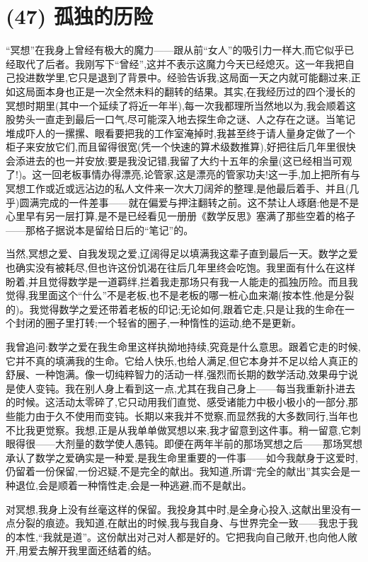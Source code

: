 \section{(47) 孤独的历险}

“冥想”在我身上曾经有极大的魔力——跟从前“女人”的吸引力一样大,而它似乎已经取代了后者。我刚写下“曾经”,这并不表示这魔力今天已经熄灭。这一年我把自己投进数学里,它只是退到了背景中。经验告诉我,这局面一天之内就可能翻过来,正如这局面本身也正是一次全然未料的翻转的结果。其实,在我经历过的四个漫长的冥想时期里(其中一个延续了将近一年半),每一次我都理所当然地以为,我会顺着这股势头一直走到最后一口气,尽可能深入地去探生命之谜、人之存在之谜。当笔记堆成吓人的一摞摞、眼看要把我的工作室淹掉时,我甚至终于请人量身定做了一个柜子来安放它们,而且留得很宽(凭一个快速的算术级数推算),好把往后几年里很快会添进去的也一并安放;要是我没记错,我留了大约十五年的余量(这已经相当可观了!)。这一回老板事情办得漂亮,论管家,这是漂亮的管家功夫!这一手,加上把所有与冥想工作或近或远沾边的私人文件来一次大刀阔斧的整理,是他最后着手、并且(几乎)圆满完成的一件差事——就在偏爱与押注翻转之前。这不禁让人琢磨:他是不是心里早有另一层打算,是不是已经看见一册册《数学反思》塞满了那些空着的格子——那格子据说本是留给日后的“笔记”的。

当然,冥想之爱、自我发现之爱,辽阔得足以填满我这辈子直到最后一天。数学之爱也确实没有被耗尽,但也许这份饥渴在往后几年里终会吃饱。我里面有什么在这样盼着,并且觉得数学是一道羁绊,拦着我走那场只有我一人能走的孤独历险。而且我觉得,我里面这个“什么”不是老板,也不是老板的哪一桩心血来潮(按本性,他是分裂的)。我觉得数学之爱还带着老板的印记;无论如何,跟着它走,只是让我的生命在一个封闭的圈子里打转;一个轻省的圈子,一种惰性的运动,绝不是更新。

 我曾追问:数学之爱在我生命里这样执拗地持续,究竟是什么意思。跟着它走的时候,它并不真的填满我的生命。它给人快乐,也给人满足,但它本身并不足以给人真正的舒展、一种饱满。像一切纯粹智力的活动一样,强烈而长期的数学活动,效果毋宁说是使人变钝。我在别人身上看到这一点,尤其在我自己身上——每当我重新扑进去的时候。这活动太零碎了,它只动用我们直觉、感受诸能力中极小极小的一部分,那些能力由于久不使用而变钝。长期以来我并不觉察,而显然我的大多数同行,当年也不比我更觉察。我想,正是从我单单做冥想以来,我才留意到这件事。稍一留意,它刺眼得很——大剂量的数学使人愚钝。即便在两年半前的那场冥想之后——那场冥想承认了数学之爱确实是一种爱,是我生命里重要的一件事——如今我献身于这爱时,仍留着一份保留,一份迟疑,不是完全的献出。我知道,所谓“完全的献出”其实会是一种退位,会是顺着一种惰性走,会是一种逃避,而不是献出。

对冥想,我身上没有丝毫这样的保留。我投身其中时,是全身心投入,这献出里没有一点分裂的痕迹。我知道,在献出的时候,我与我自身、与世界完全一致——我忠于我的本性,“我就是道”。这份献出对己对人都是好的。它把我向自己敞开,也向他人敞开,用爱去解开我里面还结着的结。

